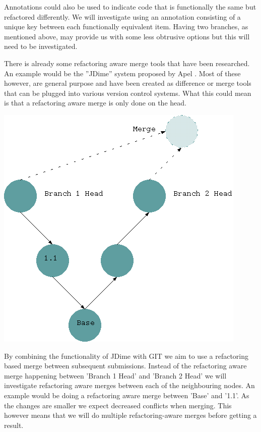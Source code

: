 \documentclass[12pt]{CRPITStyle}
\renewcommand{\cite}{\citep}
\begin{document}
Annotations could also be used to indicate code that is functionally the same but refactored differently. We will investigate using an annotation consisting of a unique key between each functionally equivalent item. Having two branches, as mentioned above, may provide us with some less obtrusive options but this will need to be investigated.

There is already some refactoring aware merge tools that have been researched. An example would be the ''JDime'' system proposed by Apel \cite{Apel2011}. Most of these however, are general purpose and have been created as difference or merge tools that can be plugged into various version control systems. What this could mean is that a refactoring aware merge is only done on the head.

\begin{center}
\includegraphics[scale=0.5]{git-diag2}
\end{center}

By combining the functionality of JDime with GIT we aim to use a refactoring based merge between subsequent submissions.  Instead of the refactoring aware merge happening between 'Branch 1 Head' and 'Branch 2 Head' we will investigate refactoring aware merges between each of the neighbouring nodes. An example would be doing a refactoring aware merge between 'Base' and '1.1'.  As the changes are smaller we expect decreased conflicts when merging.  This however means that we will do multiple refactoring-aware merges before getting a result.
\end{document}
